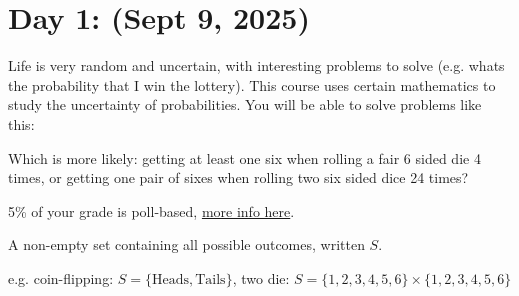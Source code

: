 \section{Day 1: (Sept 9, 2025)}

Life is very random and uncertain, with interesting problems to solve (e.g. whats the probability that I win the lottery). This course uses certain mathematics to study the uncertainty of probabilities. You will be able to solve problems like this:

\begin{problem}
Which is more likely: getting at least one six when rolling a fair 6 sided die 4 times, or getting one pair of sixes when rolling two six sided dice 24 times?
\end{problem}

5\% of your grade is poll-based, \href{http://probability.ca/jeff/teaching/2526/sta257/pollinfo.html}{more info here}.

\begin{definition}
A non-empty set containing all possible outcomes, written $S$.
\end{definition}

e.g. coin-flipping: $S = \{ \text{Heads}, \text{Tails} \}$, two die: $S = \{ 1, 2, 3, 4, 5, 6 \} \times \{ 1, 2, 3, 4 ,5 , 6 \}$

